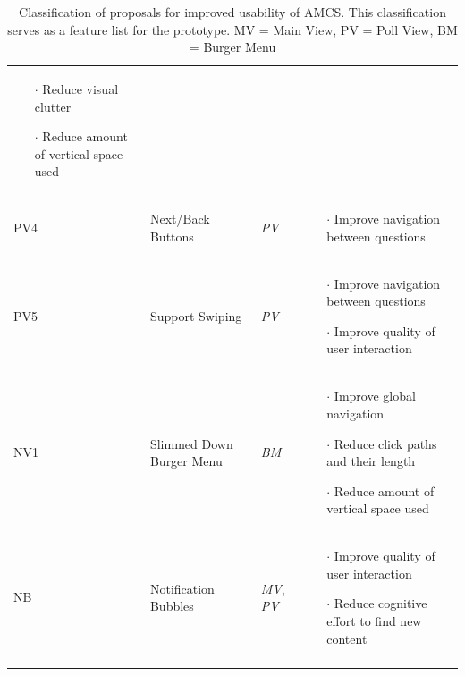 \begin{small}
\begin{longtable}{ p{0.7cm} p{3.8cm} p{1cm} p{6.6cm}}
\begin{itemize}[leftmargin=*, noitemsep, topsep=0pt]
			\item[$\cdot$] Reduce visual clutter
			\item[$\cdot$] Reduce amount of vertical space used
		\end{itemize} \vspace{-0.45cm} \\
		PV4 & Next/Back Buttons & \emph{PV} &
		\begin{itemize}[leftmargin=*, noitemsep, topsep=0pt]
			\item[$\cdot$] Improve navigation between questions
		\end{itemize} \vspace{-0.45cm} \\ 
		PV5 & Support Swiping & \emph{PV} &
		\vspace{-0.45cm}	
		\begin{itemize}[leftmargin=*, noitemsep, topsep=0pt]
			\item[$\cdot$] Improve navigation between questions
			\item[$\cdot$] Improve quality of user interaction
		\end{itemize} \vspace{-0.45cm} \\ 
		NV1 & Slimmed Down Burger Menu & \emph{BM} & 		\vspace{-0.45cm}	
		\begin{itemize}[leftmargin=*, noitemsep, topsep=0pt]
			\item[$\cdot$] Improve global navigation
			\item[$\cdot$] Reduce click paths and their length
			\item[$\cdot$] Reduce amount of vertical space used
		\end{itemize} \vspace{-0.45cm} \\ 
		NB & Notification Bubbles & \emph{MV}, \newline \emph{PV} &
		\vspace{-0.45cm}	
		\begin{itemize}[leftmargin=*, noitemsep, topsep=0pt]
			\item[$\cdot$] Improve quality of user interaction
			\item[$\cdot$] Reduce cognitive effort to find new content
		\end{itemize} \vspace{-0.45cm} \\ \hline
		\caption{Classification of proposals for improved usability of AMCS. This classification serves as a feature list for the prototype. MV = Main View, PV = Poll View, BM = Burger Menu}
		\label{tab:proposals}
	\end{longtable}
\end{small}
